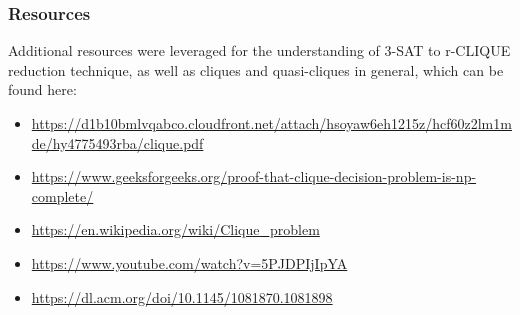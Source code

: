 \documentclass{beamer}
\begin{document}
\begin{frame}

  \frametitle{Resources}

  Additional resources were leveraged for the understanding of 3-SAT to r-CLIQUE reduction technique, as well as cliques and quasi-cliques in general, which can be found here: 

  \begin{itemize}
    \item \url{https://d1b10bmlvqabco.cloudfront.net/attach/hsoyaw6eh1215z/hcf60z2lm1mde/hy4775493rba/clique.pdf}
    \item \url{https://www.geeksforgeeks.org/proof-that-clique-decision-problem-is-np-complete/}
    \item \url{https://en.wikipedia.org/wiki/Clique_problem}
    \item \url{https://www.youtube.com/watch?v=5PJDPIjIpYA}
    \item \url{https://dl.acm.org/doi/10.1145/1081870.1081898}
  \end{itemize}
  \vspace{2.5mm}

\end{frame}
\end{document}

